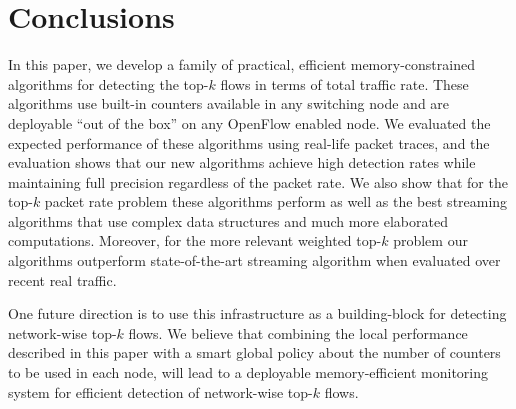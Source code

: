\section{Conclusions}
In this paper, we develop a family of practical, efficient memory-constrained algorithms for detecting the top-$k$ flows in terms of total traffic rate. These algorithms use built-in counters available in any switching node and are deployable “out of the box” on any OpenFlow enabled node. We evaluated the expected performance of these algorithms using real-life packet traces, and the evaluation shows that our new algorithms achieve high detection rates while maintaining full precision regardless of the packet rate. We also show that for the top-$k$ packet rate problem these algorithms perform as well as the best streaming algorithms that use complex data structures and much more elaborated computations. Moreover, for the more relevant weighted top-$k$ problem our algorithms outperform state-of-the-art streaming algorithm when evaluated over recent real traffic. 

One future direction is to use this infrastructure as a building-block for detecting network-wise top-$k$ flows. We believe that combining the local performance described in this paper with a smart global policy about the number of counters to be used in each node, will lead to a deployable memory-efficient monitoring system for efficient detection of network-wise top-$k$ flows.






